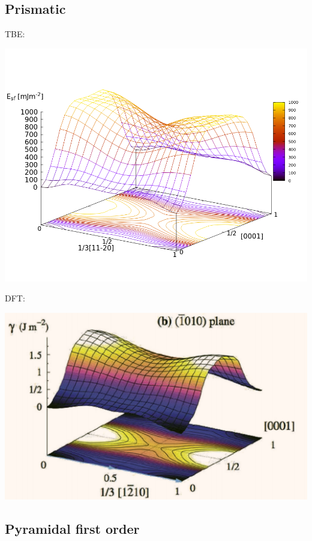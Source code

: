\documentclass[11pt]{article}
\begin{document}
\subsection{Prismatic}
\label{sec:org6b85602}

TBE:
\begin{center}
\includegraphics[width=.9\linewidth]{Images/prismatic_gamma_surface_final_model_angle_smaller.png}
\end{center}

DFT:
\begin{center}
\includegraphics[width=.9\linewidth]{Images/rodney_prismatic_ti_gamma_surface.png}
\end{center}

\subsection{Pyramidal first order}
\label{sec:org9134d2e}
\end{document}
